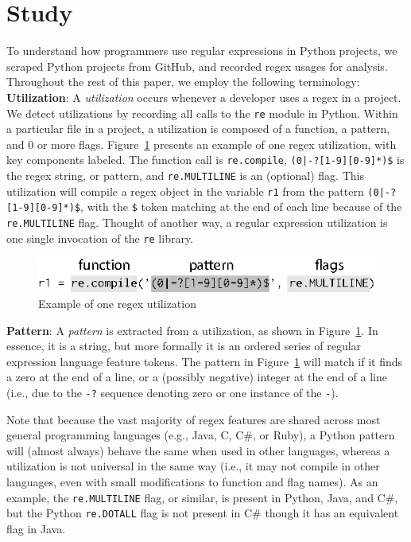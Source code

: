 \section{Study}
\label{sec:study}

To understand how programmers use regular expressions in Python projects, we scraped  Python projects from GitHub, and recorded regex usages for analysis. Throughout the rest of this paper, we  employ the following terminology:\\

\noindent \textbf{Utilization}: A \emph{utilization} occurs whenever a developer uses a regex  in a project.  We detect utilizations by recording all calls to the {\tt re} module in Python.
Within a particular file in a project, a {utilization} is composed of a function, a pattern, and 0 or more flags.  Figure~\ref{fig:exampleUsage} presents an example of one regex {utilization}, with key components labeled. The function call is {\tt re.compile}, \verb!(0|-?[1-9][0-9]*)$! is the regex string, or pattern, and {\tt re.MULTILINE} is an (optional) flag. This {utilization}  will compile a regex object in the variable {\tt r1} from the pattern \verb!(0|-?[1-9][0-9]*)$!, with the \verb!$! token matching at the end of each line because of the {\tt re.MULTILINE} flag. Thought of another way, a regular expression  utilization is one single invocation of the {\tt re} library.\\

\begin{figure}[tb]
\centering
\includegraphics[width=\columnwidth]{../illustrations/exampleUsage.eps}
\caption{Example of one regex utilization}
\label{fig:exampleUsage}
\end{figure}

\noindent \textbf{Pattern}: A \emph{pattern} is extracted from a utilization, as shown in Figure~\ref{fig:exampleUsage}. In essence, it is a string, but more formally it is an ordered series of regular expression language feature tokens.  The pattern in Figure~\ref{fig:exampleUsage}  will match if it finds a zero at the end of a line, or a (possibly negative) integer at the end of a line (i.e., due to the {\tt -?} sequence denoting zero or one instance of the {\tt -}).

Note that because the vast majority of regex features are shared across most general programming languages (e.g., Java, C, C\#, or Ruby), a Python {pattern} will (almost always) behave the same when used in other languages, whereas a utilization is not universal in the same way (i.e., it may not compile in other languages, even with small modifications to function and flag names).
As an example, the {\tt re.MULTILINE} flag, or similar, is present in Python, Java, and C\#, but  the Python {\tt re.DOTALL} flag is not present in C\# though it has an equivalent flag in Java.

